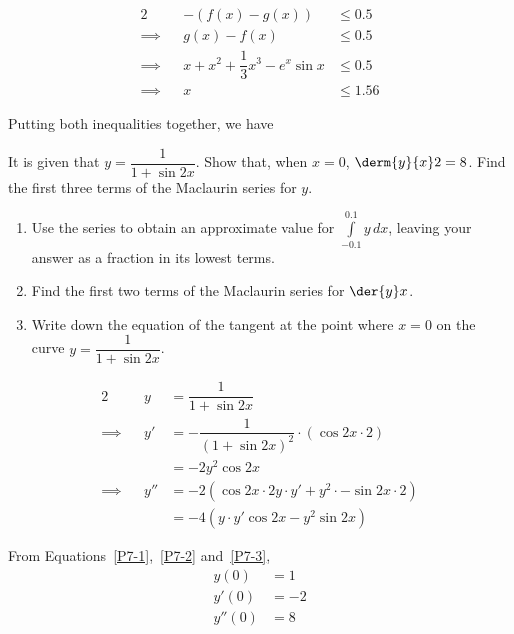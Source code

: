 \documentclass{jhwhw}
\begin{document}
            \begin{alignat*}{2}
                &&-\left(f(x) - g(x)\right) &\leq 0.5\\
                \implies&&g(x) - f(x) &\leq 0.5\\
                \implies&&x + x^2 + \dfrac13 x^3 - e^x \sin x &\leq 0.5\\
                \implies&&x &\leq 1.56
            \end{alignat*}

            Putting both inequalities together, we have


    \problem{}
        It is given that $y = \dfrac1{1 + \sin 2x}$. Show that, when $x = 0$, $\derm{y}{x}2 = 8$. Find the first three terms of the Maclaurin series for $y$.

        \begin{enumerate}
            \item Use the series to obtain an approximate value for $\int\limits_{-0.1}^{0.1} y \, dx$, leaving your answer as a fraction in its lowest terms.
            \item Find the first two terms of the Maclaurin series for $\der{y}x$.
            \item Write down the equation of the tangent at the point where $x = 0$ on the curve $y = \dfrac1{1 + \sin 2x}$.
        \end{enumerate}

    \solution
        \begin{alignat}{2}
            && y &= \dfrac1{1 + \sin 2x} \label{P7-1} \\
            \implies&&y' &= -\dfrac1{(1+\sin 2x)^2} \cdot (\cos 2x \cdot 2)\nonumber\\
            && &= -2 y^2\cos 2x \label{P7-2}\\
            \implies&&y'' &= -2 \left(\cos 2x \cdot 2y\cdot y' + y^2 \cdot -\sin 2x \cdot 2\right)\nonumber\\
            && &= -4\left(y\cdot y' \cos 2x - y^2\sin 2x  \right)\label{P7-3}
        \end{alignat}
        
        From Equations~\ref{P7-1},~\ref{P7-2} and~\ref{P7-3},
        \begin{align*}
            y(0) &= 1\\
            y'(0) &= -2\\
            y''(0) &= 8
        \end{align*}
\end{document}
